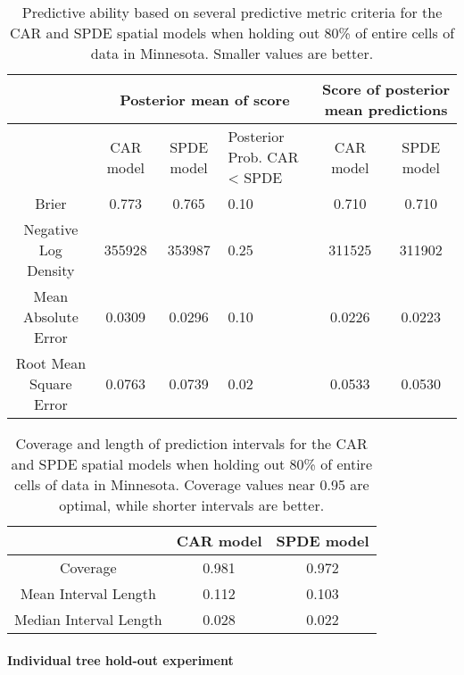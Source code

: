 \documentclass[12pt]{article}\usepackage[]{graphicx}\usepackage[]{color}
\providecommand{\tabularnewline}{\\}
\begin{document}
\begin{table}
\caption{Predictive ability based on several predictive metric criteria for
the CAR and SPDE spatial models when holding out 80\% of entire cells
of data in Minnesota. Smaller values are better.}


\begin{tabular}{|c|c|c|>{\centering}p{3cm}|c|c|}
\hline 
 &
\multicolumn{3}{c|}{{\small{Posterior mean of score}}} &
\multicolumn{2}{c|}{{\small{Score of posterior mean predictions}}}\tabularnewline
\hline 
\hline 
 &
{\small{CAR model}} &
{\small{SPDE model}} &
{\small{Posterior Prob. CAR < SPDE}} &
{\small{CAR model}} &
{\small{SPDE model}}\tabularnewline
\hline 
{\small{Brier}} &
{\small{0.773}} &
{\small{0.765}} &
{\small{0.10}} &
{\small{0.710}} &
{\small{0.710}}\tabularnewline
\hline 
{\small{Negative Log Density}} &
{\small{355928}} &
{\small{353987}} &
{\small{0.25}} &
{\small{311525}} &
{\small{311902}}\tabularnewline
\hline 
{\small{Mean Absolute Error}} &
{\small{0.0309}} &
{\small{0.0296}} &
{\small{0.10}} &
{\small{0.0226}} &
{\small{0.0223}}\tabularnewline
\hline 
{\small{Root Mean Square Error}} &
{\small{0.0763}} &
{\small{0.0739}} &
{\small{0.02}} &
{\small{0.0533}} &
{\small{0.0530}}\tabularnewline
\hline 
\end{tabular}

\label{tab:score_cell_20percent}
\end{table}


\begin{table}
\caption{Coverage and length of prediction intervals for the CAR and SPDE spatial
models when holding out 80\% of entire cells of data in Minnesota.
Coverage values near 0.95 are optimal, while shorter intervals are
better.}


\begin{tabular}{|c|c|c|}
\hline 
 &
{\small{CAR model}} &
{\small{SPDE model}}\tabularnewline
\hline 
{\small{Coverage}} &
{\small{0.981}} &
{\small{0.972}}\tabularnewline
\hline 
{\small{Mean Interval Length}} &
{\small{0.112}} &
{\small{0.103}}\tabularnewline
\hline 
{\small{Median Interval Length}} &
{\small{0.028}} &
{\small{0.022}}\tabularnewline
\hline 
\end{tabular}

\label{tab:coverage_cell_20percent}
\end{table}



\paragraph{Individual tree hold-out experiment}
\end{document}

